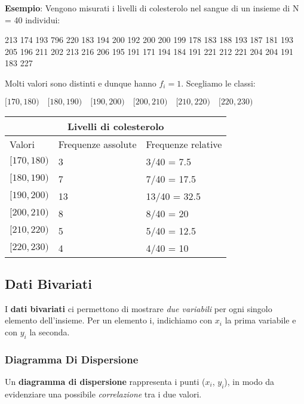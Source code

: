 \begin{tcolorbox}
\textbf{Esempio}: Vengono misurati i livelli di colesterolo nel sangue di un insieme di N = 40 individui: 
\begin{center}
    213 174 193 796 220 183 194 200 192 200  200 199 178 183 188 193 187 181 193 205 196 211 202 213 216 206 195 191 171 194 184 191 221 212 221 204 204 191 183 227
\end{center}
Molti valori sono distinti e dunque hanno $f_i = 1$. Scegliamo le classi: 
\begin{center}
    ${[170,180) \quad [180,190) \quad [190,200) \quad [200,210) \quad [210,220) \quad [220,230)}$
\end{center}

\begin{tabular}{ |p{3.5cm}|p{3.5cm}|p{3.5cm}|  }
    \hline
    \multicolumn{3}{|c|}{Livelli di colesterolo} \\
    \hline
    Valori & Frequenze assolute & Frequenze relative \\
    \hline
    $[170,180)$ & 3 & 3/40 = 7.5 \\
    $[180,190)$ & 7 & 7/40 = 17.5 \\
    $[190,200)$ & 13 & 13/40 = 32.5 \\
    $[200,210)$ & 8 & 8/40 = 20 \\
    $[210,220)$ & 5 & 5/40 = 12.5 \\
    $[220,230)$ & 4 & 4/40 = 10 \\
    \hline
\end{tabular}
\end{tcolorbox}

\newpage
\subsection{Dati Bivariati}


I \textbf{dati bivariati} ci permettono di mostrare \textit{due variabili} per ogni singolo elemento dell'insieme. Per un elemento i, indichiamo con $x_i$ la prima variabile e con $y_i$ la seconda.

\subsubsection{Diagramma Di Dispersione} 

Un \textbf{diagramma di dispersione} rappresenta i punti ($x_i$, $y_i$), in modo da evidenziare una possibile \textit{correlazione} tra i due valori.\newline

